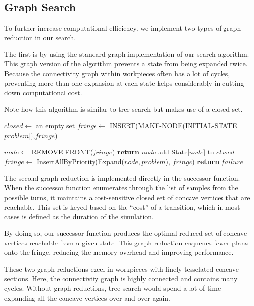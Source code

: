 	\subsection{Graph Search}

To further increase computational efficiency, we implement two types of graph reduction in our search.

The first is by using the standard graph implementation of our search algorithm. This graph version of the algorithm prevents a state from being expanded twice. Because the connectivity graph within workpieces often has a lot of cycles, preventing more than one expansion at each state helps considerably in cutting down computational cost.

Note how this algorithm is similar to tree search but makes use of a closed set.

\begin{algorithm}[H]
\begin{algorithmic}[1]
	\State $closed \gets$ an empty set
	\State $fringe \gets$ INSERT(MAKE-NODE(INITIAL-STATE[$problem$]),$fringe$)

		\State $node \gets$ REMOVE-FRONT($fringe$)
			\State \textbf{return} $node$ 
		\EndIf
			\State add State[$node$] to $closed$
			\State $fringe \gets$ InsertAllByPriority(Expand($node, problem$), $fringe$)
		\EndIf
	\EndWhile
	\State \textbf{return} $failure$ 

\EndFunction

\end{algorithmic}
\end{algorithm}

The second graph reduction is implemented directly in the successor function. When the successor function enumerates through the list of samples from the possible turns, it maintains a cost-sensitive closed set of concave vertices that are reachable. This set is keyed based on the ``cost'' of a transition, which in most cases is defined as the duration of the simulation.

By doing so, our successor function produces the optimal reduced set of concave vertices reachable from a given state. This graph reduction enqueues fewer plans onto the fringe, reducing the memory overhead and improving performance.

These two graph reductions excel in workpieces with finely-tesselated concave sections. Here, the connectivity graph is highly connected and contains many cycles. Without graph reductions, tree search would spend a lot of time expanding all the concave vertices over and over again.

